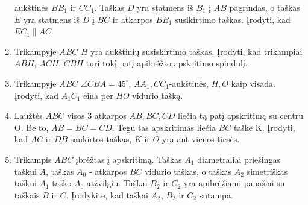 \begin{enumerate}
  aukštinės $BB_1$ ir $CC_1$. Taškas $D$ yra statmens iš
  $B_1$ į $AB$ pagrindas, o taškas $E$ yra statmens iš $D$ į
  $BC$ ir atkarpos $BB_1$ susikirtimo taškas. Įrodyti, kad
  $EC_1\parallel{AC}$.
\item Trikampyje $ABC$ $H$ yra aukštinių susiskirtimo
  taškas. Įrodyti, kad trikampiai $ABH$, $ACH$, $CBH$ turi
  tokį patį apibrėžto apskritimo spindulį.
\item Trikampyje $ABC$ $\angle CBA = 45^\circ$, $AA_1,
  CC_1$-aukštinės, $H, O$ kaip visada. Įrodyti, kad $A_1C_1$
  eina per $HO$ vidurio tašką.
\item Laužtės $ABC$ visos 3 atkarpos $AB, BC, CD$ liečia tą
  patį apskritimą su centru O. Be to, $AB = BC = CD$. Tegu
  tas apskritimas liečia $BC$ taške K. Įrodyti, kad $AC$ ir
  $DB$ sankirtos taškas, $K$ ir $O$ yra ant vienos tiesės.
\item Trikampis $ABC$ įbrėžtas į apskritimą. Taškas $A_1$
  diametraliai priešingas taškui $A$, taškas $A_0$ -
  atkarpos $BC$ vidurio taškas, o taškas $A_2$ simetriškas
  taškui $A_1$ taško $A_0$ atžvilgiu. Taškai $B_2$ ir $C_2$
  yra apibrėžiami panašiai su taškais $B$ ir $C$. Įrodykite,
  kad taškai $A_2$, $B_2$ ir $C_2$ sutampa.

\end{enumerate}
